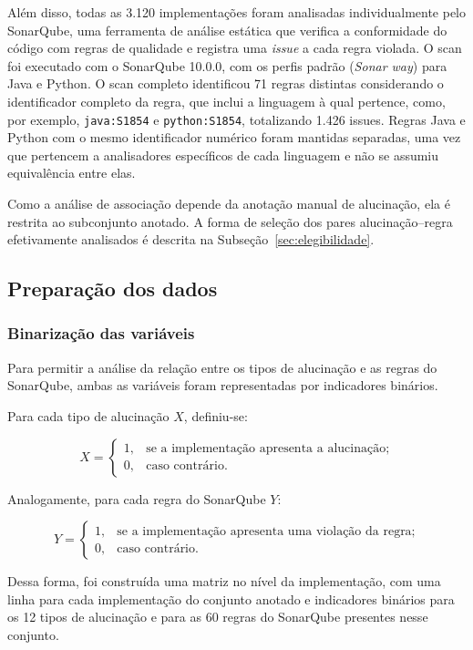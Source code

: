 Além disso, todas as 3.120 implementações foram analisadas individualmente pelo SonarQube, uma ferramenta de análise estática que verifica a conformidade do código com regras de qualidade e registra uma \textit{issue} a cada regra violada. O scan foi executado com o SonarQube 10.0.0, com os perfis padrão (\textit{Sonar way}) para Java e Python. O scan completo identificou 71 regras distintas considerando o identificador completo da regra, que inclui a linguagem à qual pertence, como, por exemplo, \texttt{java:S1854} e \texttt{python:S1854}, totalizando 1.426 issues. Regras Java e Python com o mesmo identificador numérico foram mantidas separadas, uma vez que pertencem a analisadores específicos de cada linguagem e não se assumiu equivalência entre elas.

Como a análise de associação depende da anotação manual de alucinação, ela é restrita ao subconjunto anotado. A forma de seleção dos pares alucinação--regra efetivamente analisados é descrita na Subseção~\ref{sec:elegibilidade}.

\subsection{Preparação dos dados}

\subsubsection{Binarização das variáveis}

Para permitir a análise da relação entre os tipos de alucinação e as regras do SonarQube, ambas as variáveis foram representadas por indicadores binários.

Para cada tipo de alucinação $X$, definiu-se:

\[
X =
\begin{cases}
1, & \text{se a implementação apresenta a alucinação;}\\
0, & \text{caso contrário.}
\end{cases}
\]

Analogamente, para cada regra do SonarQube $Y$:

\[
Y =
\begin{cases}
1, & \text{se a implementação apresenta uma violação da regra;}\\
0, & \text{caso contrário.}
\end{cases}
\]

Dessa forma, foi construída uma matriz no nível da implementação, com uma linha para cada implementação do conjunto anotado e indicadores binários para os 12 tipos de alucinação e para as 60 regras do SonarQube presentes nesse conjunto.

